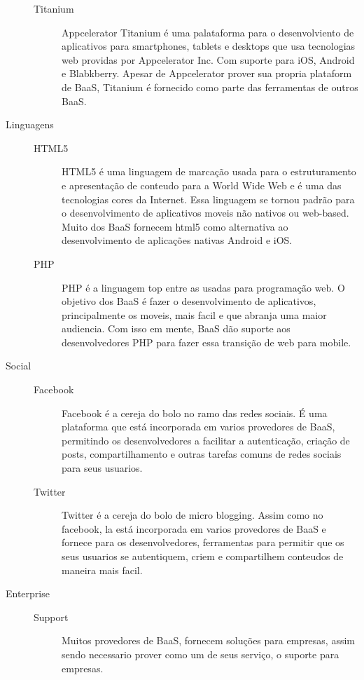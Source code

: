 \begin{description}
\begin{description}
				\item[Titanium] { Appcelerator Titanium é uma palataforma para o desenvolviento de aplicativos para smartphones, tablets e desktops que usa tecnologias web providas por Appcelerator Inc. Com suporte para iOS, Android e Blabkberry. Apesar de Appcelerator prover sua propria plataform de BaaS, Titanium é fornecido como parte das ferramentas de outros BaaS.}
			\end{description}

		\item[Linguagens]
			\begin{description}
				\item[]
                \item[HTML5] { HTML5 é uma linguagem de marcação usada para o estruturamento e apresentação de conteudo para a World Wide Web e é uma das tecnologias cores da Internet. Essa linguagem se tornou padrão para o desenvolvimento de aplicativos moveis não nativos ou web-based. Muito dos BaaS fornecem html5 como alternativa ao desenvolvimento de aplicações nativas Android e iOS.}

				\item[PHP] { PHP é a linguagem top entre as usadas para programação web. O objetivo dos BaaS é fazer o desenvolvimento de aplicativos, principalmente os moveis, mais facil e que abranja uma maior audiencia. Com isso em mente, BaaS dão suporte aos desenvolvedores PHP para fazer essa transição de web para mobile.}
			\end{description}

		\item[Social]
			\begin{description}
				\item[]
                \item[Facebook] { Facebook é a cereja do bolo no ramo das redes sociais. É uma plataforma que está incorporada em varios provedores de BaaS, permitindo os desenvolvedores a facilitar a autenticação, criação de posts, compartilhamento e outras tarefas comuns de redes sociais para seus usuarios. }

				\item[Twitter] { Twitter é a cereja do bolo de micro blogging. Assim como no facebook, la está incorporada em varios provedores de BaaS e fornece para os desenvolvedores, ferramentas para permitir que os seus usuarios se autentiquem, criem e compartilhem conteudos de maneira mais facil. }
			\end{description}

		\item[Enterprise]
			\begin{description}
				\item[] 
                \item[Support] { Muitos provedores de BaaS, fornecem soluções para empresas, assim sendo necessario prover como um de seus serviço, o suporte para empresas.}
			\end{description}
	\end{description}

